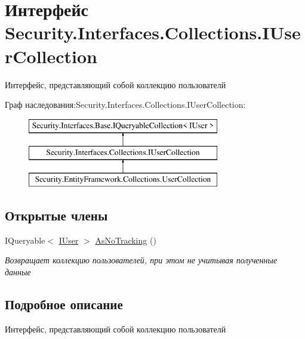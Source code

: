 \hypertarget{interface_security_1_1_interfaces_1_1_collections_1_1_i_user_collection}{}\section{Интерфейс Security.\+Interfaces.\+Collections.\+I\+User\+Collection}
\label{interface_security_1_1_interfaces_1_1_collections_1_1_i_user_collection}


Интерфейс, представляющий собой коллекцию пользователй  


Граф наследования\+:Security.\+Interfaces.\+Collections.\+I\+User\+Collection\+:\begin{figure}[H]
\begin{center}
\leavevmode
\includegraphics[height=3.000000cm]{db/dce/interface_security_1_1_interfaces_1_1_collections_1_1_i_user_collection}
\end{center}
\end{figure}
\subsection*{Открытые члены}
\begin{DoxyCompactItemize}
\item 
I\+Queryable$<$ \hyperlink{interface_security_1_1_interfaces_1_1_model_1_1_i_user}{I\+User} $>$ \hyperlink{interface_security_1_1_interfaces_1_1_collections_1_1_i_user_collection_a0c07c3db6d4b0123b4713c3ce436ef61}{As\+No\+Tracking} ()
\begin{DoxyCompactList}\small\item\em Возвращает коллекцию пользователей, при этом не учитывая полученные данные \end{DoxyCompactList}\end{DoxyCompactItemize}


\subsection{Подробное описание}
Интерфейс, представляющий собой коллекцию пользователй 



